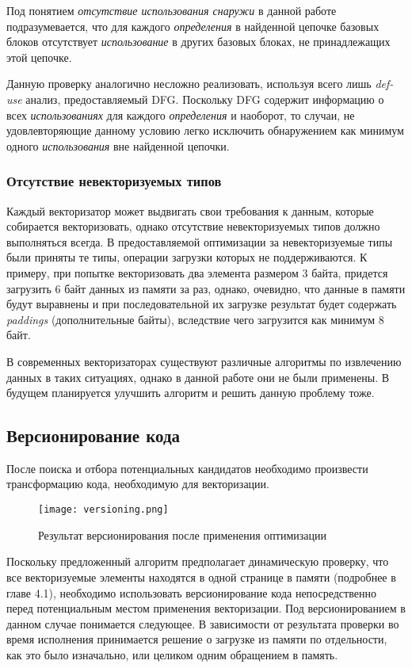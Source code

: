 Под понятием \textit{отсутствие использования снаружи} в данной работе подразумевается, что для каждого \textit{определения} в найденной цепочке базовых блоков отсутствует \textit{использование} в других базовых блоках, не принадлежащих этой цепочке.

Данную проверку аналогично несложно реализовать, используя всего лишь \textit{def-use} анализ, предоставляемый DFG. Поскольку DFG содержит информацию о всех \textit{использованиях} для каждого \textit{определения} и наоборот, то случаи, не удовлевторяющие данному условию легко исключить обнаружением как минимум одного \textit{использования} вне найденной цепочки.

\subsubsection{Отсутствие невекторизуемых типов}

Каждый векторизатор может выдвигать свои требования к данным, которые собирается векторизовать, однако отсутствие невекторизуемых типов должно выполняться всегда. В предоставляемой оптимизации за невекторизуемые типы были приняты те типы, операции загрузки которых не поддерживаются. К примеру, при попытке векторизовать два элемента размером 3 байта, придется загрузить 6 байт данных из памяти за раз, однако, очевидно, что данные в памяти будут выравнены и при последовательной их загрузке результат будет содержать \textit{paddings} (дополнительные байты), вследствие чего загрузится как минимум 8 байт.

В современных векторизаторах существуют различные алгоритмы по извлечению данных в таких ситуациях, однако в данной работе они не были применены. В будущем планируется улучшить алгоритм и решить данную проблему тоже.

\subsection{Версионирование кода}

После поиска и отбора потенциальных кандидатов необходимо произвести трансформацию кода, необходимую для векторизации.

\begin{figure}[!htb]
    \centering
    \texttt{[image: versioning.png]}
    \caption{Результат версионирования после применения оптимизации}
    \label{vers}
\end{figure}

Поскольку предложенный алгоритм предполагает динамическую проверку, что все векторизуемые элементы находятся в одной странице в памяти (подробнее в главе 4.1), необходимо использовать версионирование кода непосредственно перед потенциальным местом применения векторизации. Под версионированием в данном случае понимается следующее. В зависимости от результата проверки во время исполнения принимается решение о загрузке из памяти по отдельности, как это было изначально, или целиком одним обращением в память.

